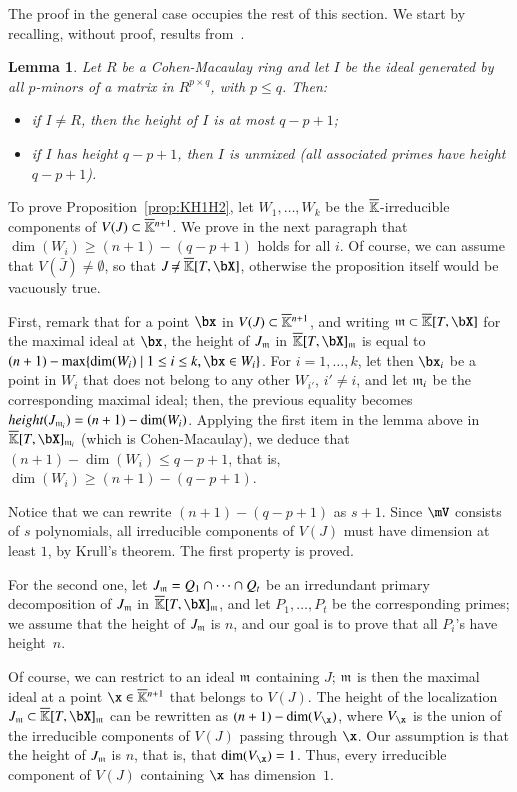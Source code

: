 \documentclass[amsthm]{elsart}
\newtheorem{lemma}[definition]{Lemma}
\begin{document}
The proof in the general case occupies the rest of this section. We start by
recalling, without proof, results from~\cite[Section~6]{EN62}.

\begin{lemma}\label{lemma:EN}
  Let $R$ be a Cohen-Macaulay ring and let $I$ be the ideal generated
  by all $p$-minors of a matrix in $R^{p\times q}$,
  with $p \le q$. Then:
  \begin{itemize}
  \item if $I \ne R$, then the height of $I$ is at most $q-p+1$;
  \item if $I$ has height $q-p+1$, then $I$ is unmixed (all associated
    primes have height $q-p+1$).
\end{itemize}
\end{lemma}

To prove Proposition~\ref{prop:KH1H2}, let $W_1,\dots,W_k$ be the
$\overline{\mathbb{K}}$-irreducible components of $V(\relax J)\subset
\overline{\mathbb{K}}{}^{n+1}$. We prove in the next paragraph that $\dim(W_i) \ge
(n+1) -(q-p+1)$ holds for all $i$. Of course, we can assume that
$V(\bar J)\ne \emptyset$, so that $\bar J \ne \KKbar[T,\bX]$, otherwise the
proposition itself would be vacuously true.

First, remark that for a point $\bx$ in $V(\relax J)\subset \overline{\mathbb{K}}{}^{n+1}$, and
writing $\m \subset \KKbar[T,\bX]$ for the maximal ideal at $\bx$, the height of
$\relax J_{\mathfrak{m}}$ in $\KKbar[T,\bX]_\m$ is equal to $(n+1)-\max\{ \dim(W_i) \mid 1 \le i
\le k, \bx \in W_i\}$. For $i=1,\dots,k$, let then $\bx_i$ be a point in $W_i$
that does not belong to any other $W_{i'}$, $i' \ne i$, and let $\mathfrak{m}_i$ be the
corresponding maximal ideal; then, the previous equality becomes ${\relax
  height}(\relax J_{\mathfrak{m}_i})=(n+1)-\dim(W_i)$. Applying the first item in the lemma above
in $\KKbar[T,\bX]_{\m_i}$ (which is Cohen-Macaulay), we deduce that
$(n+1)-\dim(W_i) \le q-p+1$, that is, $\dim(W_i) \ge (n+1) -(q-p+1)$.

Notice that we can rewrite $(n+1)-(q-p+1)$ as $s+1$.  Since $\mV$
consists of $s$ polynomials, all irreducible components of $V(J)$ must
have dimension at least $1$, by Krull's theorem. The first property
 is proved.

For the second one, let $J_{\mathfrak{m}}=Q_1 \cap \cdots \cap Q_t$ be an
irredundant primary decomposition of $J_{\mathfrak{m}}$ in $\KKbar[T,\bX]_\m$, and
let $P_1,\dots,P_t$ be the corresponding primes; we assume that the
height of $J_{\mathfrak{m}}$ is $n$, and our goal is to prove that all $P_i$'s
have height~$n$.

Of course, we can restrict to an ideal $\mathfrak{m}$ containing $J$; $\mathfrak{m}$ is
then the maximal ideal at a point $\x \in \KKbar{}^{n+1}$ that belongs
to $V(J)$. The height of the localization
$J_\m \subset \KKbar[T,\bX]_\m$ can be rewritten as
$(n+1)-\dim(V_\x)$, where $V_\x$ is the union of the irreducible
components of $V(J)$ passing through $\x$. Our assumption 
is that the height of $J_{\mathfrak{m}}$ is $n$, that is, that
$\dim(V_\x)=1$. Thus, every irreducible component of $V(J)$ containing
$\x$ has dimension~$1$.
\end{document}
